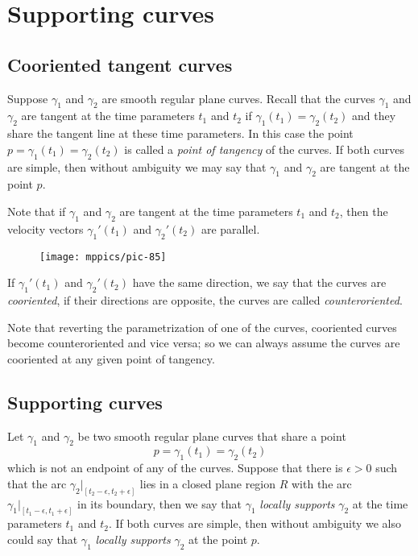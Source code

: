 \chapter{Supporting curves}
\label{chap:supporting-curves}
\section{Cooriented tangent curves}

Suppose $\gamma_1$ and $\gamma_2$ are smooth regular plane curves.
Recall that the curves $\gamma_1$ and $\gamma_2$ are tangent at the  time parameters $t_1$ and $t_2$
if $\gamma_1(t_1)=\gamma_2(t_2)$
and they share the tangent line at these time parameters.
In this case the point $p=\gamma_1(t_1)=\gamma_2(t_2)$ is called a \emph{point of tangency} of the curves.
If both curves are simple, then without ambiguity we may say that $\gamma_1$ and $\gamma_2$ are tangent at the point $p$.

Note that if $\gamma_1$ and $\gamma_2$ are tangent at the time parameters $t_1$ and $t_2$, 
then the velocity vectors $\gamma_1'(t_1)$ and $\gamma_2'(t_2)$ are parallel.
\begin{figure}[!ht]
\vskip-0mm
\centering
\texttt{[image: mppics/pic-85]}
\vskip0mm
\end{figure}
If $\gamma_1'(t_1)$ and $\gamma_2'(t_2)$ have the same direction, we say that the curves are \emph{cooriented},
if their directions are opposite, the curves are called \emph{counteroriented}.


Note that reverting the parametrization of one of the curves, cooriented curves become counteroriented and vice versa; so we can always assume the curves are cooriented at any given point of tangency.

\section{Supporting curves}

Let $\gamma_1$ and $\gamma_2$ be two smooth regular plane curves that share a point \[p=\gamma_1(t_1)=\gamma_2(t_2)\] which is not an endpoint of any of the curves.
Suppose that there is $\epsilon>0$ such that the arc $\gamma_2|_{[t_2-\epsilon, t_2+\epsilon]}$ lies in a closed plane region $R$ with the arc $\gamma_1|_{[t_1-\epsilon, t_1+\epsilon]}$ in its boundary,
then we say that $\gamma_1$ \emph{locally supports} $\gamma_2$ at the time parameters $t_1$ and $t_2$.
If both curves are simple, then  without ambiguity we also could say that $\gamma_1$ {}\emph{locally supports} $\gamma_2$ at the point $p$.

